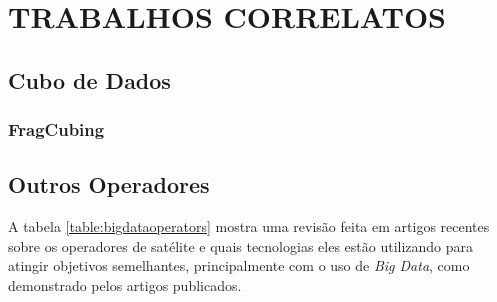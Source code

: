 
\chapter{TRABALHOS CORRELATOS}
\label{ch:corr}

\section{Cubo de Dados}
\label{ch:corr:cube}

\subsection{FragCubing}
\label{ch:corr:cube:frag}

\section{Outros Operadores}
\label{ch:corr:ops}

A tabela \ref{table:bigdataoperators} mostra uma revisão feita em artigos recentes sobre os operadores de satélite e quais tecnologias eles estão utilizando para atingir objetivos semelhantes, principalmente com o uso de \textit{Big Data}, como demonstrado pelos artigos publicados.

